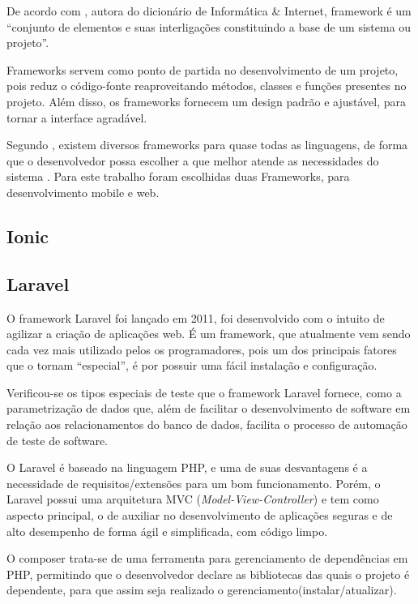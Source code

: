 De acordo com , autora do dicionário de Informática \& Internet, framework é um “conjunto de elementos e suas interligações constituindo a base de um sistema ou projeto”.

Frameworks servem como ponto de partida no desenvolvimento de um projeto, pois reduz o código-fonte reaproveitando métodos, classes e funções presentes no projeto. Além disso, os frameworks fornecem um design padrão e ajustável, para tornar a interface agradável.\cite{gabardo2017laravel}

Segundo , existem diversos frameworks para quase todas as linguagens, de forma que o desenvolvedor possa escolher a que melhor atende as necessidades do sistema . Para este trabalho foram escolhidas duas Frameworks, para desenvolvimento mobile e web.

\subsection{Ionic}



\subsection{Laravel}

O framework Laravel foi lançado em 2011, foi desenvolvido com o intuito de agilizar a criação de aplicações web. É um framework, que atualmente vem sendo cada vez mais utilizado pelos os programadores, pois um dos principais fatores que o tornam “especial”, é por possuir uma fácil instalação e configuração. 

\begin{citacao}
	Verificou-se os tipos especiais de teste que o framework Laravel fornece, como a parametrização de dados que, além de facilitar o desenvolvimento de software em relação aos relacionamentos do banco de dados, facilita o processo de automação de teste de software.\cite{pelizza2018estudo}
\end{citacao}


O Laravel é baseado na linguagem PHP, e uma de suas desvantagens é a necessidade de requisitos/extensões para um bom funcionamento. Porém, o Laravel possui uma arquitetura MVC (\textit{Model-View-Controller}) e tem como aspecto principal, o de auxiliar no desenvolvimento de aplicações seguras e de alto desempenho de forma ágil e simplificada, com código limpo.\cite{pelizza2018estudo}


O composer trata-se de uma ferramenta para gerenciamento de dependências em PHP, permitindo que o desenvolvedor declare as bibliotecas das quais o projeto é dependente, para que assim seja realizado o gerenciamento(instalar/atualizar). \cite{composer}
